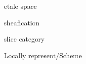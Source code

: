 \begin{example}
  
\end{example}

\begin{example}
  
\end{example}

\begin{example}
  
\end{example}
etale space

sheafication

slice category

Locally represent/Scheme

